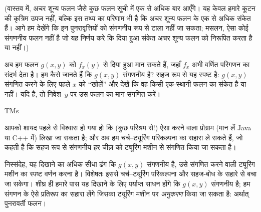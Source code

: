 \documentclass[../../../include/open-logic-section]{subfiles}
\begin{document}
(वास्तव में, अचर शून्य फलन जैसे कुछ फलन सूची में एक से अधिक बार आएँगे।
यह केवल हमारे कूटन की कृत्रिम उपज नहीं, बल्कि इस तथ्य का परिणाम भी है कि
अचर शून्य फलन के एक से अधिक संकेत हैं। आगे हम देखेंगे कि इन
पुनरावृत्तियों को संगणनीय रूप से टाला नहीं जा सकता; मसलन, ऐसा कोई
संगणनीय फलन नहीं है जो यह निर्णय करे कि दिया हुआ संकेत अचर शून्य फलन को
निरूपित करता है या नहीं।)

अब हम फलन $g(x,y)$ को $f_x(y)$ से दिया हुआ मान सकते हैं, जहाँ $f_x$
अभी वर्णित परिगणन का संदर्भ देता है। हम कैसे जानते हैं कि $g(x,y)$
संगणनीय है? सहज रूप से यह स्पष्ट है: $g(x,y)$ संगणित करने के लिए पहले
$x$ को ``खोलें'' और देखें कि वह किसी एक-स्थानी फलन का संकेत है या नहीं।
यदि है, तो निवेश~$y$ पर उस फलन का मान संगणित करें।

\begin{tagblock}{TMs}
\begin{digress}
आपको शायद पहले से विश्वास हो गया हो कि (कुछ परिश्रम से!) ऐसा करने वाला
प्रोग्राम (मान लें Java या C++ में) लिखा जा सकता है; और अब हम
चर्च--ट्यूरिंग परिकल्पना का सहारा ले सकते हैं, जो कहती है कि सहज रूप से
संगणनीय हर चीज़ को ट्यूरिंग मशीन से संगणित किया जा सकता है।

निस्संदेह, यह दिखाने का अधिक सीधा ढंग कि $g(x,y)$ संगणनीय है, उसे
संगणित करने वाली ट्यूरिंग मशीन का स्पष्ट वर्णन करना है। विशेषतः इससे
चर्च--ट्यूरिंग परिकल्पना और सहज-बोध के सहारे से बचा जा सकेगा। शीघ्र ही
हमारे पास यह दिखाने के लिए पर्याप्त साधन होंगे कि $g(x,y)$ संगणनीय है;
हम संगणन के ऐसे प्रतिरूप का सहारा लेंगे जिसका ट्यूरिंग मशीन पर
\emph{अनुकरण} किया जा सकता है: अर्थात् पुनरावर्ती फलन।
\end{digress}
\end{tagblock}
\end{document}
